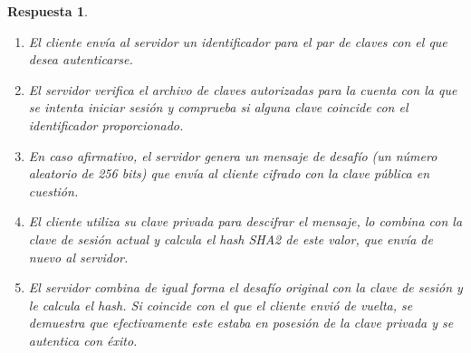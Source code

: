 \documentclass[
  a4paper,
  spanish,
  12pt,
]{scrartcl}
\theoremstyle{ejercicio-style}
\theoremstyle{remark-style}
\newtheorem*{sol}{Respuesta}
\theoremstyle{teorema-style}
\begin{document}
\begin{sol}
  \begin{enumerate}
    \item El cliente envía al servidor un identificador para el par de claves con el que desea autenticarse.
    \item El servidor verifica el archivo de claves autorizadas para la cuenta con la que se intenta iniciar sesión y comprueba si alguna clave coincide con el identificador proporcionado.
    \item En caso afirmativo, el servidor genera un \textit{mensaje de desafío} (un número aleatorio de 256 bits) que envía al cliente cifrado con la clave pública en cuestión.
    \item El cliente utiliza su clave privada para descifrar el mensaje, lo combina con la clave de sesión actual y calcula el \textit{hash} SHA2 de este valor, que envía de nuevo al servidor.
    \item El servidor combina de igual forma el desafío original con la clave de sesión y le calcula el \textit{hash}. Si coincide con el que el cliente envió de vuelta, se demuestra que efectivamente este estaba en posesión de la clave privada y se autentica con éxito.
  \end{enumerate}

\end{sol}
\end{document}
